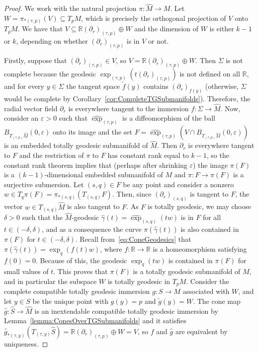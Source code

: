 \documentclass[11pt,a4paper,final]{amsart}
\newcommand{\R}{\mathbb{R}}
\renewcommand{\hat}{\widehat}
\renewcommand{\tilde}{\widetilde}
\theoremstyle{definition}
\begin{document}
\begin{proof}
	We work with the natural projection $\pi\colon \hat{M}\to M$.
	Let $W=\pi_{*(\tau,p)}(V)\subseteq T_{p}M$, which is precisely the orthogonal projection of $V$ onto $T_{p}M$.
	We have that $V\subseteq \R (\partial_{r})_{(\tau,p)}\oplus W$ and the dimension of $W$ is either $k-1$ or $k$, depending on whether $(\partial_{r})_{(\tau,p)}$ is in $V$ or not.
	
	Firstly, suppose that $(\partial_{r})_{(\tau,p)}\in V$, so $V=\R(\partial_{r})_{(\tau,p)}\oplus W$.
	Then $\Sigma$ is not complete because the geodesic $\exp_{(\tau,p)}(t(\partial_{r})_{(\tau,p)})$ is not defined on all $\R$, and for every $y\in \Sigma$ the tangent space $\tilde{f}(y)$ contains $(\partial_{r})_{f(y)}$ (otherwise, $\Sigma$ would be complete by Corollary~\ref{cor:CompleteTGSubmanifolds}).
	Therefore, the radial vector field $\partial_{r}$ is everywhere tangent to the immersion $f\colon \Sigma\to\hat{M}$.
	Now, consider an $\varepsilon>0$ such that $\hat{\exp}_{(\tau,p)}$ is a diffeomorphism of the ball $B_{T_{(\tau,p)}\hat{M}}(0,\varepsilon)$ onto its image and the set $F=\hat{\exp}_{(\tau,p)}(V\cap B_{T_{(\tau,p)}\hat{M}}(0,\varepsilon))$ is an embedded totally geodesic submanifold of $\hat{M}$.
	Then $\partial_{r}$ is everywhere tangent to $F$ and the restriction of $\pi$ to $F$ has constant rank equal to $k-1$, so the constant rank theorem implies that (perhaps after shrinking $\varepsilon$) the image $\pi(F)$ is a $(k-1)$-dimensional embedded submanifold of $M$ and $\pi\colon F\to\pi(F)$ is a surjective submersion.
	Let $(s,q)\in F$ be any point and consider a nonzero $w\in T_{q}\pi(F)=\pi_{*(s,q)}(T_{(s,q)}F)$.
	Then, since $(\partial_{r})_{(s,q)}$ is tangent to $F$, the vector $w\in T_{(s,q)}\hat{M}$ is also tangent to $F$.
	As $F$ is totally geodesic, we may choose  $\delta>0$ such that the $\hat{M}$-geodesic $\hat{\gamma}(t)=\hat{\exp}_{(s,q)}(tw)$ is in $F$ for all $t\in(-\delta,\delta)$, and as a consequence the curve $\pi(\hat{\gamma}(t))$ is also contained in $\pi(F)$ for $t\in(-\delta,\delta)$.
	Recall from~\eqref{eq:ConeGeodesics} that $\pi(\hat{\gamma}(t))=\exp_{q}(f(t)w)$, where $f\colon \R \to \R$ is a homeomorphism satisfying $f(0)=0$.
	Because of this, the geodesic $\exp_{q}(tw)$ is contained in $\pi(F)$ for small values of $t$.
	This proves that $\pi(F)$ is a totally geodesic submanifold of $M$, and in particular the subspace $W$ is totally geodesic in $T_{p}M$.
	Consider the complete compatible totally geodesic immersion $g\colon S\to M$ associated with $W$, and let $y\in S$ be the unique point with $g(y)=p$ and $\tilde{g}(y)=W$.
	The cone map $\hat{g}\colon \hat{S}\to\hat{M}$ is an inextendable compatible totally geodesic immersion by Lemma~\ref{lemma:ConesOverTGSubmanifolds} and it satisfies $\hat{g}_{*(\tau,y)}(T_{(\tau,y)}\hat{S})=\R (\partial_{r})_{(\tau,p)}\oplus W = V$, so $f$ and $\hat{g}$ are equivalent by uniqueness.
	

\end{proof}
\end{document}
